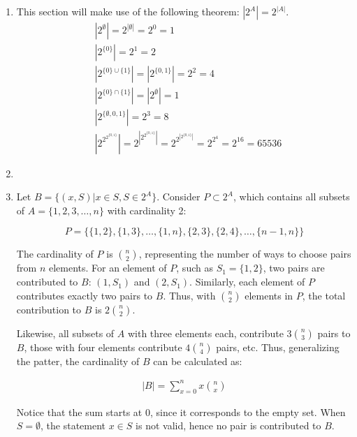 \documentclass[12pt]{article}
\newcommand{\p}[1]{\item[\textnormal{(#1)}]}
\newenvironment{ps}
{\begin{enumerate}[leftmargin=0em, itemindent=1.5em]}
{\end{enumerate}}
\begin{document}
\begin{ps}
    \p{a} This section will make use of the following theorem: \( |2^A| = 2^{|A|} \).
    \begin{align*}
        & \left|2^\emptyset\right| = 2^{\left|\emptyset\right|} = 2^0 = 1 \\
        & \left|2^{\{0\}}\right| = 2^1 = 2 \\
        & \left|2^{\{0\} \cup \{1\}}\right| = \left|2^{\{0,1\}}\right| = 2^2 = 4 \\
        & \left|2^{\{0\} \cap \{1\}}\right| = \left|2^\emptyset \right| = 1 \\
        & \left|2^{\{\emptyset, 0, 1\}}\right| = 2^3 = 8 \\
        &\left|2^{2^{2^{\{0,1\}}}}\right| = 2^{\left|2^{2^{\{0, 1\}}}\right|} 
        = 2^{2^{\left| 2^{\{0, 1\}}\right|}} = 2^{2^4} = 2^{16} = 65536
    \end{align*}

    \p{b}

    \p{i} Let \( B = \{(x, S) | x \in S, S \in 2^A \}\). Consider \( P \subset 2^A \), which
    contains all subsets of \( A = \{1, 2, 3, \ldots, n\} \) with cardinality 2:

    \[
        P = \{ \{1, 2\}, \{1,3\}, \ldots, \{1, n\}, \{2, 3\}, \{2, 4\}, \ldots, \{n-1, n\} \}
    \]

    The cardinality of \( P \) is \( \binom{n}{2} \), representing the number of ways to choose
    pairs from \( n \) elements. For an element of \( P \), such as \( S_1 = \{1,2\}\), two pairs
    are contributed to \( B \): \( (1, S_1) \) and \( (2, S_1) \). Similarly, each element of \( P
    \) contributes exactly two pairs to \( B \). Thus, with \( \binom{n}{2} \) elements in \( P \),
    the total contribution to \( B \) is \( 2 \binom{n}{2} \). \par

    Likewise, all subsets of \( A \) with three elements each, contribute \( 3 \binom{n}{3} \) pairs
    to \( B \), those with four elements contribute \( 4 \binom{n}{4} \) pairs, etc. Thus,
    generalizing the patter, the cardinality of \( B \) can be calculated as: 

    \begin{align} \label{card_B} 
        |B| = \sum_{x=0}^{n} x\binom{n}{x} 
    \end{align}

    Notice that the sum starts at 0, since it corresponds to the empty set. When \( S = \emptyset
    \), the statement \( x \in S \) is not valid, hence no pair is contributed to \( B \).


\end{ps}
\end{document}
